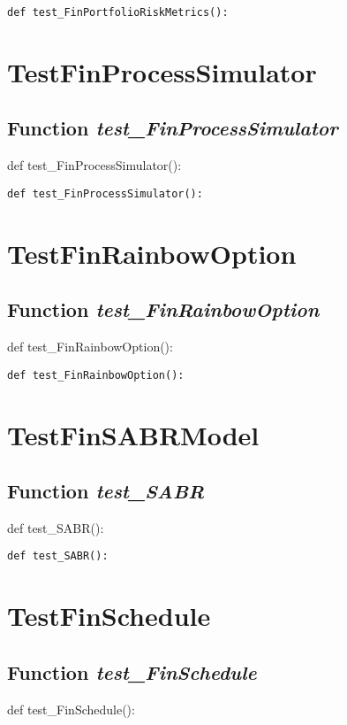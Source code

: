 \documentclass[twoside,11pt]{book}
\begin{document}
\begin{lstlisting}
def test_FinPortfolioRiskMetrics():
\end{lstlisting}


\newpage
\section{TestFinProcessSimulator}

\subsection{Function {\it test\_FinProcessSimulator}}
def test\_FinProcessSimulator():

\begin{lstlisting}
def test_FinProcessSimulator():
\end{lstlisting}


\newpage
\section{TestFinRainbowOption}

\subsection{Function {\it test\_FinRainbowOption}}
def test\_FinRainbowOption():

\begin{lstlisting}
def test_FinRainbowOption():
\end{lstlisting}


\newpage
\section{TestFinSABRModel}

\subsection{Function {\it test\_SABR}}
def test\_SABR():

\begin{lstlisting}
def test_SABR():
\end{lstlisting}


\newpage
\section{TestFinSchedule}

\subsection{Function {\it test\_FinSchedule}}
def test\_FinSchedule():
\end{document}
